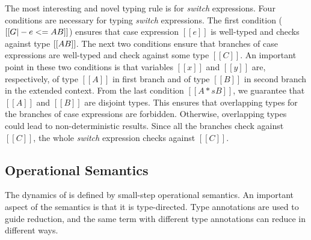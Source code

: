 The most interesting and novel typing rule is for
\emph{switch} expressions. Four conditions are necessary for typing
\emph{switch} expressions.
The first condition ($[[G |-
    e <= A \/ B]]$) ensures that case expression $[[e]]$ is well-typed
and checks against type $[[A \/ B]]$. The next two conditions ensure that
branches of case expressions are well-typed and check against some type
$[[C]]$. An important point in these two conditions is that variables
$[[x]]$ and $[[y]]$ are, respectively, of type $[[A]]$ in first branch and of type $[[B]]$ in
second branch in the extended context. 
From the last condition
$[[A *s B]]$, we guarantee that $[[A]]$ and $[[B]]$ are disjoint
types. This ensures that overlapping types for the branches of case expressions
are forbidden. Otherwise, overlapping types could lead to
non-deterministic results.
Since all the branches check against $[[C]]$, the whole
\emph{switch} expression checks against $[[C]]$.

\begin{comment}
\begin{figure}[t]
  \begin{small}
    \centering
    \drules[typ]{$ [[G |- e dirflag A]] $}{Bidirectional Typing}{int, var, ann, app, sub, abs, typeof}
  \end{small}
  \caption{Typing for \cal.}
  \label{fig:union:typ}
\end{figure}
\end{comment}

\subsection{Operational Semantics}
\label{sec:union:os}
The dynamics of \cal is defined by small-step operational semantics.
An important aspect of the semantics is that it is type-directed.
Type annotations are used to guide reduction, and the same term
with different type annotations can reduce in different ways.

